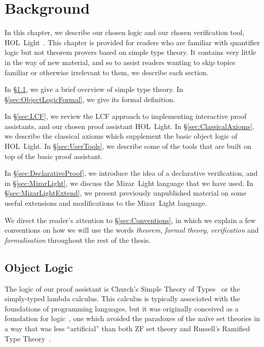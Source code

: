 \chapter{Background}\label{chapter:Background}
In this chapter, we describe our chosen logic and our chosen verification tool, \linebreak HOL~Light~\cite{HOLLight}. This chapter is provided for readers who are familiar with quantifier logic but not theorem provers based on simple type theory. It contains very little in the way of new material, and so to assist readers wanting to skip topics familiar or otherwise irrelevant to them, we describe each section.

In \S\ref{sec:ObjectLogic}, we give a brief overview of simple type theory. In \S\ref{sec:ObjectLogicFormal}, we give its formal definition.

In \S\ref{sec:LCF}, we review the LCF approach to implementing interactive proof assistants, and our chosen proof assistant HOL~Light. In \S\ref{sec:ClassicalAxioms}, we describe the classical axioms which supplement the basic object logic of HOL~Light. In \S\ref{sec:UserTools}, we describe some of the tools that are built on top of the basic proof assistant.

In \S\ref{sec:DeclarativeProof}, we introduce the idea of a declarative verification, and in \S\ref{sec:MizarLight}, we discuss the Mizar~Light language that we have used. In \S\ref{sec:MizarLightExtend}, we present previously unpublished material on some useful extensions and modifications to the Mizar~Light language.

We direct the reader's attention to \S\ref{sec:Conventions}, in which we explain a few conventions on how we will use the words \emph{theorem}, \emph{formal theory}, \emph{verification} and \emph{formalisation} throughout the rest of the thesis.

\section{Object Logic}\label{sec:ObjectLogic}
The logic of our proof assistant is Church's Simple Theory of Types~\cite{ChurchTheoryOfTypes} or the simply-typed lambda calculus. This calculus is typically associated with the foundations of programming languages, but it was originally conceived as a foundation for logic~\cite{UntypedTheoryLambdaCalculus}, one which avoided the paradoxes of the na\"{i}ve set theories in a way that was less ``artificial'' than both ZF set theory and Russell's Ramified Type Theory~\cite{RussellTheoryOfTypes}.

